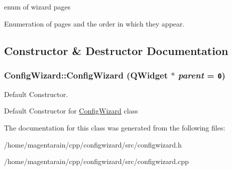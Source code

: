 enum of wizard pages 

Enumeration of pages and the order in which they appear. 

\subsection{Constructor \& Destructor Documentation}
\hypertarget{classConfigWizard_7980315d7bb0393fb519af33aaaa39d8}{
\subsubsection[{ConfigWizard}]{\setlength{\rightskip}{0pt plus 5cm}ConfigWizard::ConfigWizard (QWidget $\ast$ {\em parent} = {\tt 0})}}
\label{classConfigWizard_7980315d7bb0393fb519af33aaaa39d8}


Default Constructor. 

Default Constructor for \hyperlink{classConfigWizard}{ConfigWizard} class 

The documentation for this class was generated from the following files:\begin{CompactItemize}
\item 
/home/magentarain/cpp/configwizard/src/configwizard.h\item 
/home/magentarain/cpp/configwizard/src/configwizard.cpp\end{CompactItemize}
